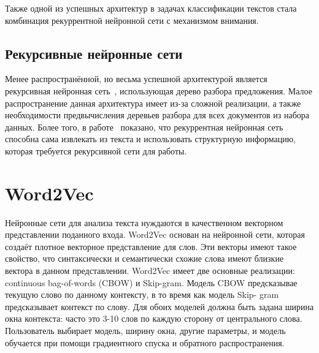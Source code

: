 Также одной из успешных архитектур в задачах классификации текстов стала комбинация рекуррентной нейронной сети с механизмом внимания\cite{bahdanau}.

\subsection{Рекурсивные нейронные сети}
Менее распространённой, но весьма успешной архитектурой является рекурсивная нейронная сеть~\cite{socher-rdm}, использующая дерево разбора предложения. Малое распространение данная архитектура имеет из-за сложной реализации, а также необходимости предвычисления деревьев разбора для всех документов из набора данных. Более того, в работе~\cite{Bowman} показано, что рекуррентная нейронная сеть способна сама извлекать из текста и использовать структурную информацию, которая требуется рекурсивной сети для работы.

\section{Word2Vec}
Нейронные сети для анализа текста нуждаются в качественном векторном представлении поданного входа. Word2Vec \cite{word2vec} основан на нейронной сети, которая создаёт плотное векторное представление для слов. Эти векторы имеют такое свойство, что синтаксически и семантически схожие слова имеют близкие вектора в данном представлении. Word2Vec имеет две основные реализации: continuous bag-of-words (CBOW) и Skip-gram. Модель CBOW предсказывае текущую слово по данному контексту, в то время как модель Skip-
gram предсказывает контекст по слову. Для обоих моделей должна быть задана ширина окна контекста: часто это 3-10 слов по каждую сторону от центрального слова. Пользователь выбирает модель, ширину окна, другие параметры, и модель обучается при помощи градиентного спуска и обратного распространения.
